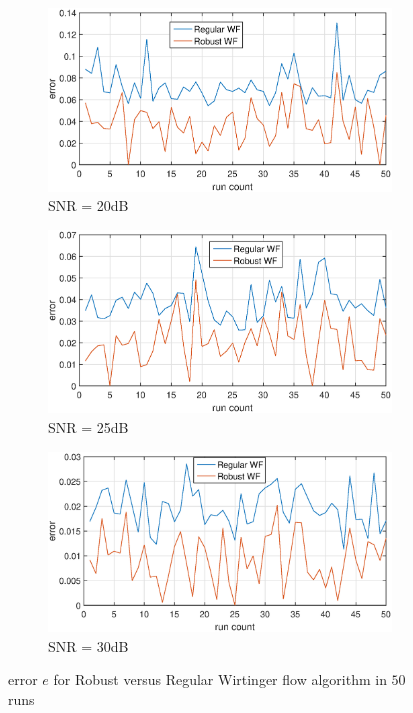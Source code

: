  \begin{figure}  \ContinuedFloat
 \centering 
     \begin{subfigure}[b]{0.75\textwidth}
         \centering
         \includegraphics[width=\textwidth]{figs/snr_20db}
         \caption{SNR = 20dB}
         \label{fig:five over x}
     \end{subfigure}
     \hfill
     \begin{subfigure}[b]{0.75\textwidth}
         \centering
         \includegraphics[width=\textwidth]{figs/snr_25db}
         \caption{SNR = 25dB}
         \label{fig:five over x}
     \end{subfigure}
     \hfill
     \begin{subfigure}[b]{0.75\textwidth}
         \centering
         \includegraphics[width=\textwidth]{figs/snr_30db}
         \caption{SNR = 30dB}
         \label{fig:five over x}
     \end{subfigure}


        \caption{error $e$ for Robust versus Regular Wirtinger flow algorithm in $50$ runs}
        \label{fig_sim}
\end{figure}




